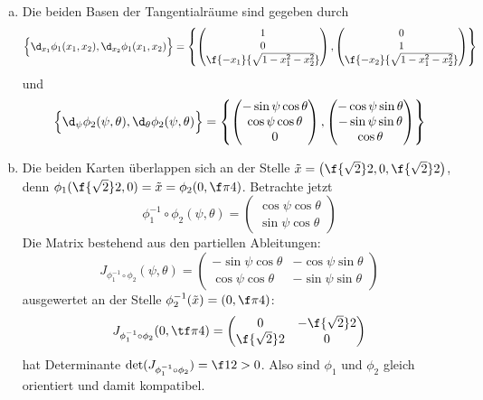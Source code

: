 \documentclass[a4paper]{scrartcl}
\begin{document}
	\begin{aufgabe}~

		\begin{enumerate}[a)]
			\item
				Die beiden Basen der Tangentialräume sind gegeben durch
				\[
					\Big\{ \d_{x_1} \phi_1(x_1,x_2), \d_{x_2} \phi_1(x_1,x_2) \Big\}
					= \left\{ \begin{pmatrix}
						1 \\ 0 \\ \f{-x_1}{\sqrt{1-x_1^2 -x_2^2}}
					\end{pmatrix}, \begin{pmatrix}
						0 \\ 1 \\ \f{-x_2}{\sqrt{1-x_1^2 -x_2^2}}
					\end{pmatrix} \right\}
				\]
				und
				\[
					\Big\{ \d_{\psi} \phi_2(\psi,\theta), \d_{\theta} \phi_2(\psi,\theta) \Big\}
					= \left\{ \begin{pmatrix}
							-\sin \psi \cos \theta \\ \cos \psi \cos \theta \\ 0
					\end{pmatrix}, \begin{pmatrix}
						-\cos \psi \sin \theta \\ -\sin \psi \sin \theta \\ \cos \theta
					\end{pmatrix} \right\}
				\]
			\item
				Die beiden Karten überlappen sich an der Stelle $\tilde x = \big(\f{\sqrt 2}2, 0, \f{\sqrt 2}2\big)$, denn $\phi_1(\f{\sqrt 2}2, 0) = \tilde x = \phi_2(0, \f \pi 4)$.
				Betrachte jetzt
				\[
					\phi_1^{-1} \circ \phi_2 (\psi, \theta) = \begin{pmatrix}
						\cos \psi \cos \theta \\
						\sin \psi \cos \theta
					\end{pmatrix}
				\]
				Die Matrix bestehend aus den partiellen Ableitungen:
				\[
					J_{\phi_1^{-1}\circ \phi_2} (\psi, \theta) = \begin{pmatrix}
						-\sin \psi \cos \theta & -\cos \psi  \sin \theta \\
						\cos \psi \cos \theta & -\sin \psi \sin \theta
					\end{pmatrix}
				\]
				ausgewertet an der Stelle $\phi_2^{-1}(\tilde x) = (0, \f \pi 4)$:
				\[
					J_{\phi_1^{-1}\circ \phi_2} (0, \tf \pi 4) = \begin{pmatrix}
						0 & -\f {\sqrt 2}2 \\
						\f {\sqrt 2}2 & 0
					\end{pmatrix}
				\]
				hat Determinante $\det(J_{\phi_1^{-1}\circ \phi_2}) = \f 12 > 0$.
				Also sind $\phi_1$ und $\phi_2$ gleich orientiert und damit kompatibel.


\end{enumerate}
\end{aufgabe}
\end{document}
